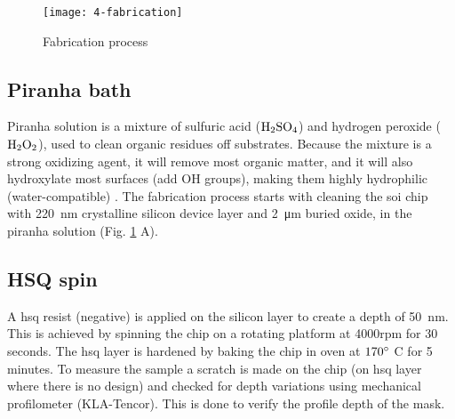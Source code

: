 \documentclass[../report.tex]{subfiles}
\begin{document}
\begin{figure}[H] %
	\centering
	\texttt{[image: 4-fabrication]}
	\caption{Fabrication process}
	\label{fig:4_fabrication}
\end{figure}


\subsection{Piranha bath}			
Piranha solution is a mixture of sulfuric acid ($\mathrm{H_2SO_4}$) and hydrogen peroxide ($\mathrm{H_2O_2}$), used to clean organic residues off substrates. Because the mixture is a strong oxidizing agent, it will remove most organic matter, and it will also hydroxylate most surfaces (add OH groups), making them highly hydrophilic (water-compatible) \cite{piranha_bath}. The fabrication process starts with cleaning the \gls{soi} chip with \SI{220}{\nano \meter} crystalline silicon device layer and \SI{2}{\micro \meter} buried oxide, in the piranha solution (Fig. \ref{fig:4_fabrication} A).
 
\subsection{HSQ spin}
A \gls{hsq} resist (negative) is applied on the silicon layer to create a depth of \SI{50}{\nano \meter}. This is achieved by spinning the chip on a  rotating platform at 4000rpm for 30 seconds. The \gls{hsq} layer is hardened by baking the chip in oven at $\mathrm{170^{\circ}}$ C for 5 minutes. To measure the sample a scratch is made on the chip (on \gls{hsq} layer where there is no design) and checked for depth variations using mechanical profilometer (KLA-Tencor). This is done to verify the profile depth of the mask.
\end{document}
